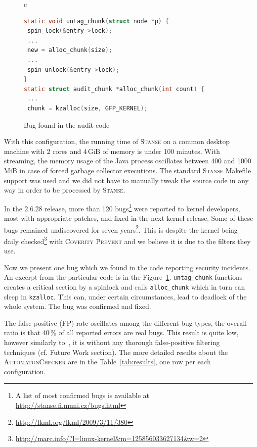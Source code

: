 \documentclass[10pt]{llncs}
\newcommand{\Stanse}{\textsc{Stanse}\xspace}
\newcommand{\AC}{\textsc{AutomatonChecker}\xspace}
\begin{document}
\begin{figure}[tb]
\begin{center}
\begin{tabular}{c}
\begin{lstlisting}[language=C]
static void untag_chunk(struct node *p) {
 spin_lock(&entry->lock);
 ...
 new = alloc_chunk(size);
 ...
 spin_unlock(&entry->lock);
}
static struct audit_chunk *alloc_chunk(int count) {
 ...
 chunk = kzalloc(size, GFP_KERNEL);
\end{lstlisting}
\end{tabular}
\end{center}
\caption{Bug found in the audit code}
\label{fig:error}
\end{figure}

With this configuration, the running time of \Stanse on a common desktop
machine with 2 cores and 4\,GiB of memory is under 100 minutes. With
streaming, the memory usage of the Java process oscillates between 400 and
1000\,MiB in case of forced garbage collector executions. The standard \Stanse
\textsf{Makefile} support was used and we did not have to manually tweak the
source code in any way in order to be processed by \Stanse.

In the 2.6.28 release, more than 120 bugs\footnote{A list of most confirmed
bugs is available at \url{http://stanse.fi.muni.cz/bugs.html}} were reported
to kernel developers, most with appropriate patches, and fixed in the next
kernel release. Some of these bugs remained undiscovered for seven
years\footnote{\url{http://lkml.org/lkml/2009/3/11/380}}. This is despite the
kernel being daily
checked\footnote{\url{http://marc.info/?l=linux-kernel&m=125856033627134&w=2}}
with \textsc{Coverity Prevent} and we believe it is due to the filters they
use.

Now we present one bug which we found in the code reporting security
incidents. An excerpt from the particular code is in the
Figure~\ref{fig:error}.  \texttt{untag\_chunk} functions creates a critical
section by a spinlock and calls \texttt{alloc\_chunk} which in turn can sleep
in \texttt{kzalloc}. This can, under certain circumstances, lead to deadlock
of the whole system. The bug was confirmed and fixed.

The false positive (FP) rate oscillates among the different bug types, the
overall ratio is that 40\,\% of all reported errors are real bugs. This result
is quite low, however similarly to~\cite{havoc}, it is without any thorough
false-positive filtering techniques (cf. Future Work section). The more
detailed results about the \AC are in the Table~\ref{tab:results}, one row
per each configuration.
\end{document}
